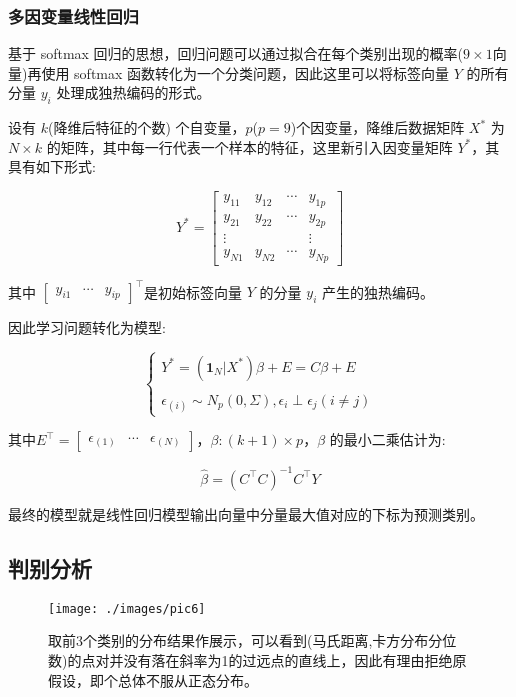 \documentclass[fleqn]{Paquetes/RevDigMatEduInt}
\begin{document}
\subsubsection{多因变量线性回归}

基于 softmax 回归的思想，回归问题可以通过拟合在每个类别出现的概率($9\times 1$向量)再使用 softmax 函数转化为一个分类问题，因此这里可以将标签向量 $Y$ 的所有分量 $y_i$ 处理成独热编码的形式。

设有 $k$(降维后特征的个数) 个自变量，$p$($p = 9$)个因变量，降维后数据矩阵 $X^*$ 为 $N\times k$ 的矩阵，其中每一行代表一个样本的特征，这里新引入因变量矩阵 $Y^*$，其具有如下形式:

$$
Y^* = \begin{bmatrix}
	y_{11} & y_{12}&\cdots &y_{1p}\\
	y_{21} & y_{22} & \cdots &y_{2p}\\
	\vdots & & &\vdots\\
	y_{N1} & y_{N2} & \cdots &y_{Np}
\end{bmatrix}
$$

其中 $\begin{bmatrix}
	y_{i1}&\cdots&y_{ip}
\end{bmatrix}^\top$是初始标签向量 $Y$ 的分量 $y_i$ 产生的独热编码。

因此学习问题转化为模型:

$$
\begin{cases}
	Y^* = (\mathbf{1}_N | X^*) \beta + E = C\beta + E\\\\
	\epsilon_{(i)} \sim N_p(0,\Sigma), \epsilon_i \perp \epsilon_j (i \ne j)
\end{cases}
$$

其中$E^\top = \begin{bmatrix}
	\epsilon_{(1)} & \cdots& \epsilon_{(N)} 
\end{bmatrix}$，$\beta:(k + 1) \times p$，$\beta$ 的最小二乘估计为:

\begin{teorema}
$$\hat{\beta} = (C^\top C)^{-1} C^\top Y$$
\end{teorema}

最终的模型就是线性回归模型输出向量中分量最大值对应的下标为预测类别。

\subsection{判别分析}
\begin{figure*}
	\centering
	\texttt{[image: ./images/pic6]}
	\caption{取前3个类别的分布结果作展示，可以看到(马氏距离,卡方分布分位数)的点对并没有落在斜率为1的过远点的直线上，因此有理由拒绝原假设，即个总体不服从正态分布。}
\end{figure*}
\end{document}
